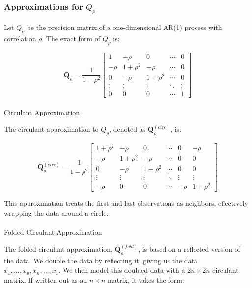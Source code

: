 \documentclass[journal=,manuscript=]{achemso}
\makeatletter
\let\oldparagraph\paragraph
\renewcommand{\paragraph}{
    \@ifstar
      \xxxParagraphStar
      \xxxParagraphNoStar
  }
\newcommand{\xxxParagraphStar}[1]{\oldparagraph*{#1}\mbox{}}
\newcommand{\xxxParagraphNoStar}[1]{\oldparagraph{#1}\mbox{}}
\makeatother
\begin{document}
\subsubsection{\texorpdfstring{Approximations for
\(Q_{\rho}\)}{Approximations for Q\_\{\textbackslash rho\}}}\label{approximations-for-q_rho}

Let \(Q_{\rho}\) be the precision matrix of a one-dimensional AR(1)
process with correlation \(\rho\). The exact form of \(Q_{\rho}\) is:

\[
\mathbf{Q}_\rho = \frac{1}{1-\rho^2}
\begin{bmatrix}
1 & -\rho & 0 & \cdots & 0 \\
-\rho & 1+\rho^2 & -\rho & \cdots & 0 \\
0 & -\rho & 1+\rho^2 & \cdots & 0 \\
\vdots & \vdots & \vdots & \ddots & \vdots \\
0 & 0 & 0 & \cdots & 1
\end{bmatrix}
\]

\paragraph{Circulant Approximation}\label{circulant-approximation}

The circulant approximation to \(Q_\rho\), denoted as
\(\mathbf{Q}_\rho^{(circ)}\), is:

\[
\mathbf{Q}_\rho^{(circ)} = \frac{1}{1-\rho^2}
\begin{bmatrix}
1+\rho^2 & -\rho & 0 & \cdots & 0 & -\rho \\
-\rho & 1+\rho^2 & -\rho & \cdots & 0 & 0 \\
0 & -\rho & 1+\rho^2 & \cdots & 0 & 0 \\
\vdots & \vdots & \vdots & \ddots & \vdots & \vdots \\
-\rho & 0 & 0 & \cdots & -\rho & 1+\rho^2
\end{bmatrix}
\]

This approximation treats the first and last observations as neighbors,
effectively wrapping the data around a circle.

\paragraph{Folded Circulant
Approximation}\label{folded-circulant-approximation}

The folded circulant approximation, \(\mathbf{Q}_\rho^{(fold)}\), is
based on a reflected version of the data. We double the data by
reflecting it, giving us the data \(x_1,  \dots, x_n, x_n, \dots, x_1\).
We then model this doubled data with a \(2n \times 2n\) circulant
matrix. If written out as an \(n \times n\) matrix, it takes the form:
\end{document}
